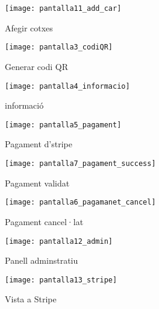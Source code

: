 \begin{slide}
    \begin{figure}[H]
    \centering
    \texttt{[image: pantalla11\_add\_car]}
    \caption{Afegir cotxes}
\end{figure}
\end{slide}
\begin{slide}
    \begin{figure}[H]
    \centering
    \texttt{[image: pantalla3\_codiQR]}
    \caption{Generar codi QR}
\end{figure}
\end{slide}
\begin{slide}
    \begin{figure}[H]
    \centering
    \texttt{[image: pantalla4\_informacio]}
    \caption{informació}
\end{figure}
\end{slide}
\begin{slide}
    \begin{figure}[H]
    \centering
    \texttt{[image: pantalla5\_pagament]}
    \caption{Pagament d'stripe}
\end{figure}
\end{slide}
\begin{slide}
    \begin{figure}[H]
    \centering
    \texttt{[image: pantalla7\_pagament\_success]}
    \caption{Pagament validat}
\end{figure}
\end{slide}
\begin{slide}
    \begin{figure}[H]
    \centering
    \texttt{[image: pantalla6\_pagamanet\_cancel]}
    \caption{Pagament cancel·lat}
\end{figure}
\end{slide}
\begin{slide}
    \begin{figure}[H]
    \centering
    \texttt{[image: pantalla12\_admin]}
    \caption{Panell adminstratiu}
\end{figure}
\end{slide}
\begin{slide}
    \begin{figure}[H]
    \centering
    \texttt{[image: pantalla13\_stripe]}
    \caption{Vista a Stripe}
\end{figure}
\end{slide}
